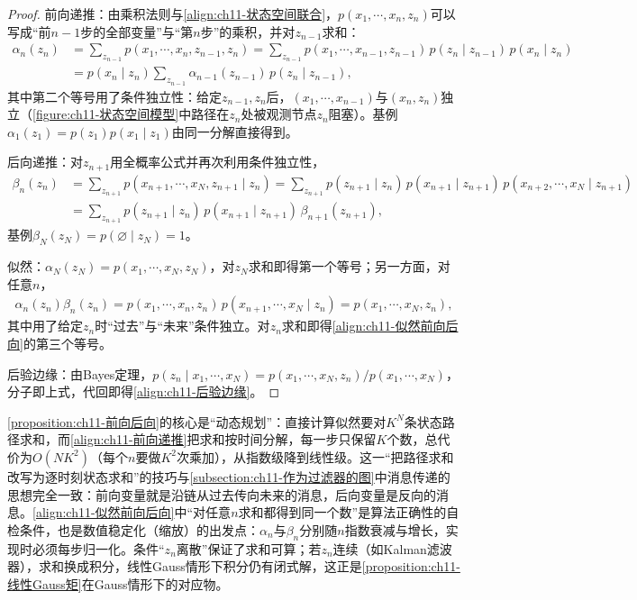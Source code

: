 \documentclass[../../main.tex]{subfiles}
\begin{document}
\begin{proof}
前向递推：由乘积法则与\eqref{align:ch11-状态空间联合}，$p(x_1,\cdots,x_n,z_n)$可以写成“前$n-1$步的全部变量”与“第$n$步”的乘积，并对$z_{n-1}$求和：
\begin{align}
  \alpha_n(z_n) &= \sum_{z_{n-1}}p(x_1,\cdots,x_n,z_{n-1},z_n)
  = \sum_{z_{n-1}}p(x_1,\cdots,x_{n-1},z_{n-1})\,p(z_n\mid z_{n-1})\,p(x_n\mid z_n)\\
  &= p(x_n\mid z_n)\sum_{z_{n-1}}\alpha_{n-1}(z_{n-1})\,p(z_n\mid z_{n-1}),
\end{align}
其中第二个等号用了条件独立性：给定$z_{n-1},z_n$后，$(x_1,\cdots,x_{n-1})$与$(x_n,z_n)$独立（\cref{figure:ch11-状态空间模型}中路径在$z_n$处被观测节点$z_n$阻塞）。基例$\alpha_1(z_1)=p(z_1)p(x_1\mid z_1)$由同一分解直接得到。

后向递推：对$z_{n+1}$用全概率公式并再次利用条件独立性，
\begin{align}
  \beta_n(z_n) &= \sum_{z_{n+1}}p(x_{n+1},\cdots,x_N,z_{n+1}\mid z_n)
  = \sum_{z_{n+1}}p(z_{n+1}\mid z_n)\,p(x_{n+1}\mid z_{n+1})\,p(x_{n+2},\cdots,x_N\mid z_{n+1})\\
  &= \sum_{z_{n+1}}p(z_{n+1}\mid z_n)\,p(x_{n+1}\mid z_{n+1})\,\beta_{n+1}(z_{n+1}),
\end{align}
基例$\beta_N(z_N)=p(\varnothing\mid z_N)=1$。

似然：$\alpha_N(z_N)=p(x_1,\cdots,x_N,z_N)$，对$z_N$求和即得第一个等号；另一方面，对任意$n$，
\begin{align}
  \alpha_n(z_n)\beta_n(z_n)=p(x_1,\cdots,x_n,z_n)\,p(x_{n+1},\cdots,x_N\mid z_n)=p(x_1,\cdots,x_N,z_n),
\end{align}
其中用了给定$z_n$时“过去”与“未来”条件独立。对$z_n$求和即得\eqref{align:ch11-似然前向后向}的第三个等号。

后验边缘：由Bayes定理，$p(z_n\mid x_1,\cdots,x_N)=p(x_1,\cdots,x_N,z_n)/p(x_1,\cdots,x_N)$，分子即上式，代回即得\eqref{align:ch11-后验边缘}。
\end{proof}

\begin{remark}
\cref{proposition:ch11-前向后向}的核心是“动态规划”：直接计算似然要对$K^N$条状态路径求和，而\eqref{align:ch11-前向递推}把求和按时间分解，每一步只保留$K$个数，总代价为$O(NK^2)$（每个$n$要做$K^2$次乘加），从指数级降到线性级。这一“把路径求和改写为逐时刻状态求和”的技巧与\cref{subsection:ch11-作为过滤器的图}中消息传递的思想完全一致：前向变量就是沿链从过去传向未来的消息，后向变量是反向的消息。\eqref{align:ch11-似然前向后向}中“对任意$n$求和都得到同一个数”是算法正确性的自检条件，也是数值稳定化（缩放）的出发点：$\alpha_n$与$\beta_n$分别随$n$指数衰减与增长，实现时必须每步归一化。条件“$z_n$离散”保证了求和可算；若$z_n$连续（如Kalman滤波器），求和换成积分，线性Gauss情形下积分仍有闭式解，这正是\cref{proposition:ch11-线性Gauss矩}在Gauss情形下的对应物。
\end{remark}
\end{document}
